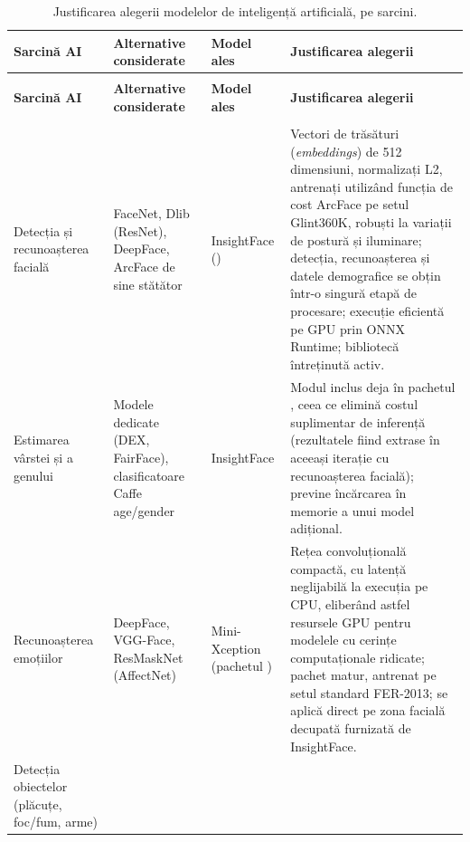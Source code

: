 \documentclass[../../main.tex]{subfiles}
\begin{document}
{\footnotesize
	\setlength{\LTleft}{0pt}
	\setlength{\LTright}{0pt}
	\renewcommand{\arraystretch}{1.25}
	\begin{xltabular}{\textwidth}{@{}>{\raggedright\arraybackslash}p{2.3cm} >{\raggedright\arraybackslash}p{2.9cm} >{\raggedright\arraybackslash}p{2.2cm} X@{}}
		\caption{Justificarea alegerii modelelor de inteligență artificială, pe sarcini.}
		\label{tab:justificare_modele}\\
		\hline
		\textbf{Sarcină AI} & \textbf{Alternative considerate} & \textbf{Model ales} & \textbf{Justificarea alegerii} \\
		\hline
		\endfirsthead
		\\
		\hline
		\textbf{Sarcină AI} & \textbf{Alternative considerate} & \textbf{Model ales} & \textbf{Justificarea alegerii} \\
		\hline
		\endhead
		\hline
		\\
		\endfoot
		\hline
		\endlastfoot
		Detecția și recunoașterea facială
		& FaceNet, Dlib (ResNet), DeepFace, ArcFace de sine stătător
		& InsightFace ()
		& Vectori de trăsături (\textit{embeddings}) de 512 dimensiuni, normalizați L2, antrenați utilizând funcția de cost ArcFace pe setul Glint360K, robuști la variații de postură și iluminare; detecția, recunoașterea și datele demografice se obțin într-o singură etapă de procesare; execuție eficientă pe GPU prin ONNX Runtime; bibliotecă întreținută activ. \\
		\hline
		Estimarea vârstei și a genului
		& Modele dedicate (DEX, FairFace), clasificatoare Caffe age/gender
		& InsightFace 
		& Modul inclus deja în pachetul , ceea ce elimină costul suplimentar de inferență (rezultatele fiind extrase în aceeași iterație cu recunoașterea facială); previne încărcarea în memorie a unui model adițional. \\
		\hline
		Recunoașterea emoțiilor
		& DeepFace, VGG-Face, ResMaskNet (AffectNet)
		& Mini-Xception (pachetul )
		& Rețea convoluțională compactă, cu latență neglijabilă la execuția pe CPU, eliberând astfel resursele GPU pentru modelele cu cerințe computaționale ridicate; pachet matur, antrenat pe setul standard FER-2013; se aplică direct pe zona facială decupată furnizată de InsightFace. \\
		\hline
		Detecția obiectelor (plăcuțe, foc/fum, arme)

\end{xltabular}}
\end{document}

